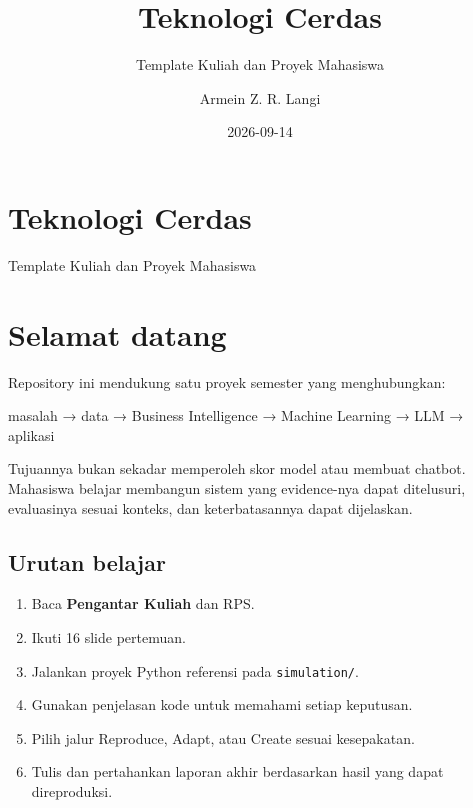 \documentclass[
  indonesian,
  letterpaper,
  DIV=11,
  numbers=noendperiod]{scrreprt}
\title{Teknologi Cerdas}
\subtitle{Template Kuliah dan Proyek Mahasiswa}
\author{Armein Z. R. Langi}
\date{2026-09-14}
\newenvironment{Shaded}{\begin{snugshade}}{\end{snugshade}}
\newcommand{\NormalTok}[1]{\textcolor[rgb]{0.00,0.23,0.31}{#1}}
\providecommand{\tightlist}{%
  \setlength{\itemsep}{0pt}\setlength{\parskip}{0pt}}
\renewcommand*\contentsname{Daftar Isi}
\newcommand\contentsname{Daftar Isi}
\begin{document}
\maketitle

\renewcommand*\contentsname{Daftar Isi}
{
\setcounter{tocdepth}{2}
\tableofcontents
}


\chapter{Teknologi Cerdas}\label{teknologi-cerdas}

Template Kuliah dan Proyek Mahasiswa

\hfill\break


\chapter*{Selamat datang}\label{selamat-datang}


Repository ini mendukung satu proyek semester yang menghubungkan:

\begin{Shaded}
\begin{Highlighting}[]
\NormalTok{masalah → data → Business Intelligence → Machine Learning → LLM → aplikasi}
\end{Highlighting}
\end{Shaded}

Tujuannya bukan sekadar memperoleh skor model atau membuat chatbot.
Mahasiswa belajar membangun sistem yang evidence-nya dapat ditelusuri,
evaluasinya sesuai konteks, dan keterbatasannya dapat dijelaskan.

\section{Urutan belajar}\label{urutan-belajar}

\begin{enumerate}
\def\labelenumi{\arabic{enumi}.}
\tightlist
\item
  Baca \textbf{Pengantar Kuliah} dan RPS.
\item
  Ikuti 16 slide pertemuan.
\item
  Jalankan proyek Python referensi pada \texttt{simulation/}.
\item
  Gunakan penjelasan kode untuk memahami setiap keputusan.
\item
  Pilih jalur Reproduce, Adapt, atau Create sesuai kesepakatan.
\item
  Tulis dan pertahankan laporan akhir berdasarkan hasil yang dapat
  direproduksi.
\end{enumerate}
\end{document}

